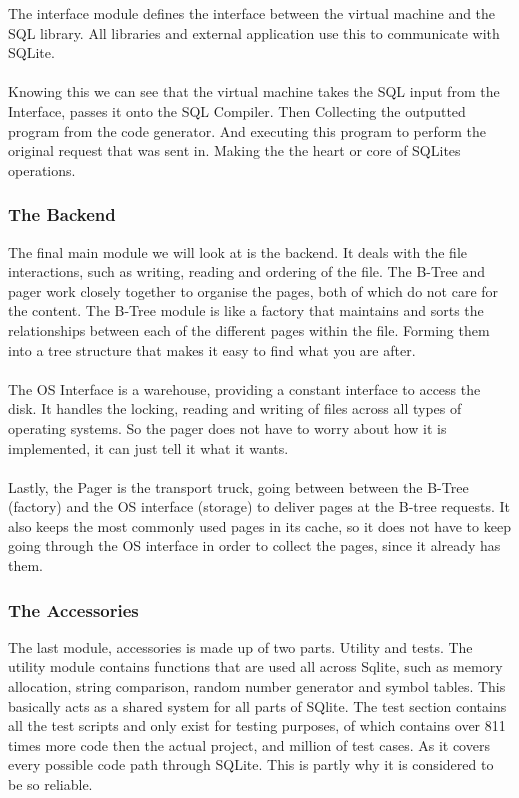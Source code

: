The interface module defines the interface between the virtual machine and the SQL library. All libraries and external application use this to communicate with SQLite.
\\\\
Knowing this we can see that the virtual machine takes the SQL input from the Interface, passes it onto the SQL Compiler. Then Collecting the outputted program from the code generator. And executing this program to perform the original request that was sent in. Making the the heart or core of SQLites operations.

\subsubsection{The Backend}
\label{subsec:how_sqlite_backend}

The final main module we will look at is the backend. It deals with the file interactions, such as writing, reading and ordering of the file. The B-Tree and pager work closely together to organise the pages, both of which do not care for the content. The B-Tree module is like a factory that maintains and sorts the relationships between each of the different pages within the file. Forming them into a tree structure that makes it easy to find what you are after. 
\\\\
The OS Interface is a warehouse, providing a constant interface to access the disk. It handles the locking, reading and writing of files across all types of operating systems. So the pager does not have to worry about how it is implemented, it can just tell it what it wants.
\\\\
Lastly, the Pager is the transport truck, going between between the B-Tree (factory) and the OS interface (storage) to deliver pages at the B-tree requests. It also keeps the most commonly used pages in its cache, so it does not have to keep going through the OS interface in order to collect the pages, since it already has them.

\subsubsection{The Accessories}
\label{subsec:how_sqlite_accessories}

The last module, accessories is made up of two parts. Utility and tests. The utility module contains functions that are used all across Sqlite, such as memory allocation, string comparison, random number generator and symbol tables. This basically acts as a shared system for all parts of SQlite. The test section contains all the test scripts and only exist for testing purposes, of which contains over 811 times more code then the actual project, and million of test cases. As it covers every possible code path through SQLite. This is partly why it is considered to be so reliable. 

